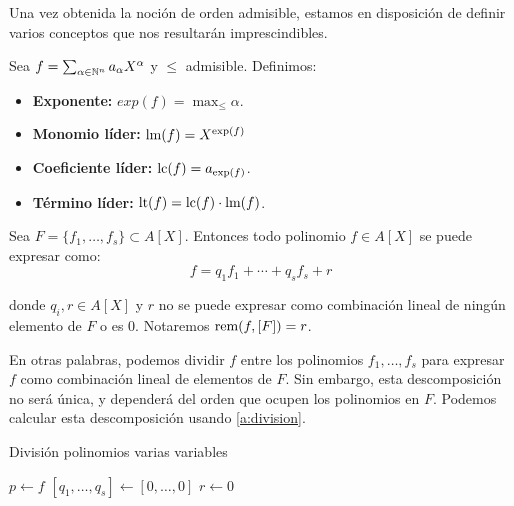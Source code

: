 Una vez obtenida la noción de orden admisible, estamos en disposición de definir varios conceptos que nos resultarán imprescindibles.

\begin{definicion}
    Sea $f= \sum_{\alpha\in \mathbb{N}^n} a_{\alpha} X^{\alpha}$ y $\le$ admisible. Definimos:
    \begin{itemize}
        \item \textbf{Exponente:} $exp(f) = \max_{\le}\alpha$.
        \item \textbf{Monomio líder:} $\text{lm}(f) = X^{\text{exp}(f)}$
        \item \textbf{Coeficiente líder:} $\text{lc}(f) = a_{\text{exp}(f)}$.
        \item \textbf{Término líder:} $\text{lt}(f) = \text{lc}(f) \cdot \text{lm}(f)$.
    \end{itemize}
\end{definicion}

\begin{teorema}
    Sea $F=\{f_1,\dots, f_s\} \subset A[X]$. Entonces todo polinomio $f\in A[X]$ se puede expresar como:
    \begin{equation*}
        f = q_1f_1 + \cdots + q_sf_s + r
    \end{equation*}

    donde $q_i, r\in A[X]$ y $r$ no se puede expresar como combinación lineal de ningún elemento de $F$ o es $0$. Notaremos $\text{rem}(f, [F]) = r$.
\end{teorema}

En otras palabras, podemos dividir $f$ entre los polinomios $f_1, \dots, f_s$ para expresar $f$ como combinación lineal de elementos de $F$. Sin embargo, esta descomposición no será única, y dependerá del orden que ocupen los polinomios en $F$. Podemos calcular esta descomposición usando \autoref{a:division}.

\begin{algorithm}[hbt!]
    \caption{División polinomios varias variables}\label{a:division}
    $p\gets f$\;
    $\left[q_1,\dots, q_s\right] \gets \left[0,\dots, 0\right]$\;
    $r\gets 0$\;

\end{algorithm}

